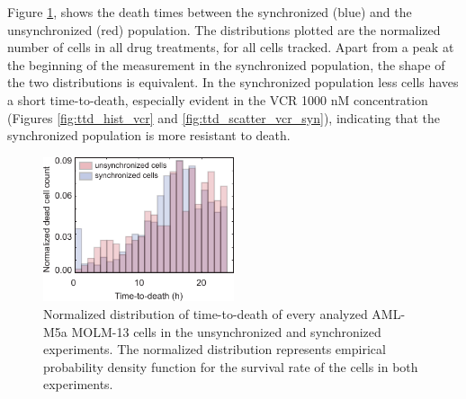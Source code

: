 \documentclass[pdftex,12pt,a4paper]{report}
\begin{document}
Figure \ref{fig:death_time_comparison}, shows the death times between the synchronized (blue) and the unsynchronized (red) population. The distributions plotted are the normalized number of cells in all drug treatments, for all cells tracked. Apart from a peak at the beginning of the measurement in the synchronized population, the shape of the two distributions is equivalent. In the synchronized population less cells haves a short time-to-death, especially evident in the VCR 1000 nM concentration (Figures \ref{fig:ttd_hist_vcr} and \ref{fig:ttd_scatter_vcr_syn}), indicating that the synchronized population is more resistant to death. 

\begin{figure}[H]
\centering
\includegraphics[width=0.5\textwidth]{images/death_time/dt.pdf}
\caption{Normalized distribution of time-to-death of every analyzed AML-M5a MOLM-13 cells in the unsynchronized and synchronized experiments. The normalized distribution represents empirical probability density function for the survival rate of the cells in both experiments.}
\label{fig:death_time_comparison}
\end{figure}


\end{document}
